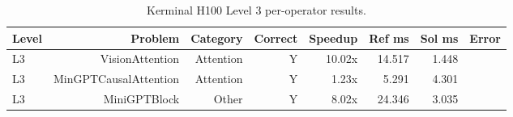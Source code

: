 \begin{table}[t]
\centering
\small
\caption{Kerminal H100 Level 3 per-operator results.}
\label{tab:kerminal-l3}
\begin{tabular}{lrrrrrrr}
\toprule
Level & Problem & Category & Correct & Speedup & Ref ms & Sol ms & Error \\
\midrule
L3 & VisionAttention & Attention & Y & 10.02x & 14.517 & 1.448 &  \\
L3 & MinGPTCausalAttention & Attention & Y & 1.23x & 5.291 & 4.301 &  \\
L3 & MiniGPTBlock & Other & Y & 8.02x & 24.346 & 3.035 &  \\
\bottomrule
\end{tabular}
\end{table}
